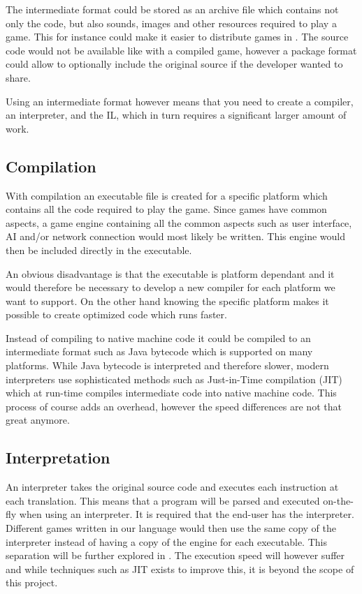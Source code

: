 The intermediate format could be stored as an archive file which contains not
only the code, but also sounds, images and other resources required to play a game. 
This for instance could make it easier to distribute games in \productname{}. The
source code would not be available like with a compiled game, however a package
format could allow to optionally include the original source if the developer
wanted to share.

Using an intermediate format however means that you need to create a compiler,
an interpreter, and the IL, which in turn requires a significant larger amount of work.

\subsection{Compilation}
\label{sec:compilation}
With compilation an executable file is created for a specific platform which
contains all the code required to play the game. Since games have common
aspects, a game engine containing all the common aspects such as user interface,
AI and/or network connection would most likely be written. This engine would
then be included directly in the executable.

An obvious disadvantage is that the executable is platform dependant and it
would therefore be necessary to develop a new compiler for each platform we want
to support. On the other hand knowing the specific platform makes it possible to
create optimized code which runs faster.

Instead of compiling to native machine code it could be compiled to an
intermediate format such as Java bytecode which is supported on many platforms.
While Java bytecode is interpreted and therefore slower, modern interpreters
use sophisticated methods such as Just-in-Time compilation (JIT) which at
run-time compiles intermediate code into native machine code. This process of
course adds an overhead, however the speed differences are not that great
anymore.
\cite{java-speed}

\subsection{Interpretation}
\label{sec:interpretation}
An interpreter takes the original source code and executes each instruction at
each translation. This means that a program will be parsed and executed
on-the-fly when using an interpreter. It is required that the end-user has the
interpreter. Different games written in our language would then use the same
copy of the interpreter instead of having a copy of the engine for each
executable. This separation will be further explored in
. The execution speed will however suffer and
while techniques such as JIT exists to improve this, it is beyond the scope of
this project.

